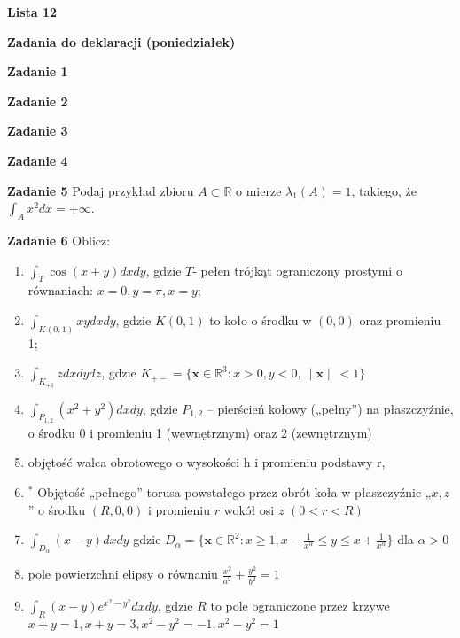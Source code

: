 \documentclass[a4paper,11pt]{article}
\newcommand{\RR}{\mathbb{R}}
\begin{document}
\begin{center}
  {\large\textbf{Lista 12}}
\end{center}

\hrulefill
\begin{center}
    \textbf{Zadania do deklaracji (poniedziałek)}
\end{center}

\bigskip

\textbf{Zadanie 1} 

\bigskip

\textbf{Zadanie 2} 

\bigskip

\textbf{Zadanie 3} 

\bigskip

\textbf{Zadanie 4} 

\bigskip

\hrulefill

\bigskip

\textbf{Zadanie 5} Podaj przykład zbioru $A \subset \RR$ o mierze
$\lambda_1(A) = 1$, takiego, że  $\int_A x^2 dx = +\infty$.

\bigskip

\textbf{Zadanie 6} Oblicz:

\begin{enumerate}
  \item $\int_T \cos(x+y) dxdy$, gdzie $T$- pełen trójkąt ograniczony
    prostymi o równaniach:  $x=0, y=\pi, x=y$;
  \item  $\int_{K(0,1)} xy dx dy$, gdzie  $K(0,1)$ to koło o środku w
    $(0,0)$ oraz promieniu 1;
  \item $\int_{K_{+1}} z dxdydz$, gdzie $K_{+-} = \{\bm{x} \in \RR^3:
    x>0, y<0, \|\bm{x}\| <1\} $
  \item $\int_{P_{1,2}} (x^2 + y^2) dxdy$, gdzie $P_{1,2}$ -- pierścień
    kołowy („pełny”) na płaszczyźnie, o środku
    0 i promieniu 1 (wewnętrznym) oraz 2 (zewnętrznym)
  \item objętość walca obrotowego o wysokości h i promieniu podstawy r,
  \item  $^\ast$ Objętość „pełnego” torusa powstałego przez obrót koła w
    płaszczyźnie „$x, z$” o
    środku $(R, 0, 0)$ i promieniu $r$ wokół osi $z$ $(0 < r < R)$
  \item $\int_{D_\alpha} (x-y) dxdy$ gdzie $D_\alpha = \{\bm{x} \in
      \RR^2: x\ge 1, x - \frac{1}{x^\alpha} \le y \le x +
    \frac{1}{x^\alpha}\}$ dla $\alpha > 0$
  \item pole powierzchni elipsy o równaniu $\frac{x^2}{a^2} +
    \frac{y^2}{b^2} = 1$
  \item $\int_{R} (x-y) e^{x^2 - y^2} dxdy$, gdzie $R$ to pole
    ograniczone przez krzywe  $x+y=1, x+y=3, x^2-y^2=-1, x^2-y^2=1$
\end{enumerate}
\end{document}
